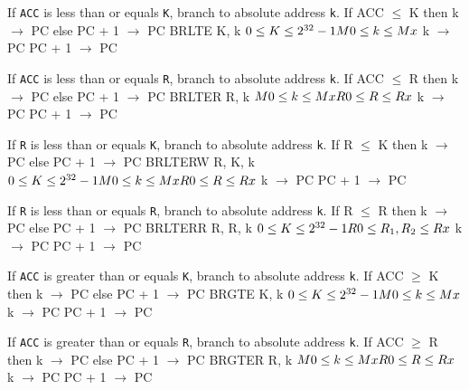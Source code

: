 \documentclass[titlepage]{scrartcl}
\begin{document}
{If \texttt{ACC} is less than or equals \texttt{K}, branch to absolute address \texttt{k}.}
{If ACC $\leq$ K then k $\rightarrow$ PC else PC + 1 $\rightarrow$ PC}
{BRLTE K, k}
{$0 \leq K \leq 2^{32} - 1 \hfill \break M0 \leq k \leq Mx$}
{k $\rightarrow$ PC \hfill \break PC + 1 $\rightarrow$ PC}
{}
{\srtable{}{}{}{}}

{If \texttt{ACC} is less than or equals \texttt{R}, branch to absolute address \texttt{k}.}
{If ACC $\leq$ R then k $\rightarrow$ PC else PC + 1 $\rightarrow$ PC}
{BRLTER R, k}
{$M0 \leq k \leq Mx \hfill \break R0 \leq R \leq Rx$}
{k $\rightarrow$ PC \hfill \break PC + 1 $\rightarrow$ PC}
{}
{\srtable{}{}{}{}}

{If \texttt{R} is less than or equals \texttt{K}, branch to absolute address \texttt{k}.}
{If R $\leq$ K then k $\rightarrow$ PC else PC + 1 $\rightarrow$ PC}
{BRLTERW R, K, k}
{$0 \leq K \leq 2^{32} - 1 \hfill \break M0 \leq k \leq Mx \hfill \break R0 \leq R \leq Rx$}
{k $\rightarrow$ PC \hfill \break PC + 1 $\rightarrow$ PC}
{}
{\srtable{}{}{}{}}

{If \texttt{R} is less than or equals \texttt{R}, branch to absolute address \texttt{k}.}
{If R $\leq$ R then k $\rightarrow$ PC else PC + 1 $\rightarrow$ PC}
{BRLTERR R, R, k}
{$0 \leq K \leq 2^{32} - 1 \hfill \break R0 \leq R_{1}, R_{2} \leq Rx$}
{k $\rightarrow$ PC \hfill \break PC + 1 $\rightarrow$ PC}
{}
{\srtable{}{}{}{}}

{If \texttt{ACC} is greater than or equals \texttt{K}, branch to absolute address \texttt{k}.}
{If ACC $\geq$ K then k $\rightarrow$ PC else PC + 1 $\rightarrow$ PC}
{BRGTE K, k}
{$0 \leq K \leq 2^{32} - 1 \hfill \break M0 \leq k \leq Mx$}
{k $\rightarrow$ PC \hfill \break PC + 1 $\rightarrow$ PC}
{}
{\srtable{}{}{}{}}

{If \texttt{ACC} is greater than or equals \texttt{R}, branch to absolute address \texttt{k}.}
{If ACC $\geq$ R then k $\rightarrow$ PC else PC + 1 $\rightarrow$ PC}
{BRGTER R, k}
{$M0 \leq k \leq Mx \hfill \break R0 \leq R \leq Rx$}
{k $\rightarrow$ PC \hfill \break PC + 1 $\rightarrow$ PC}
{}
{\srtable{}{}{}{}}
\end{document}

